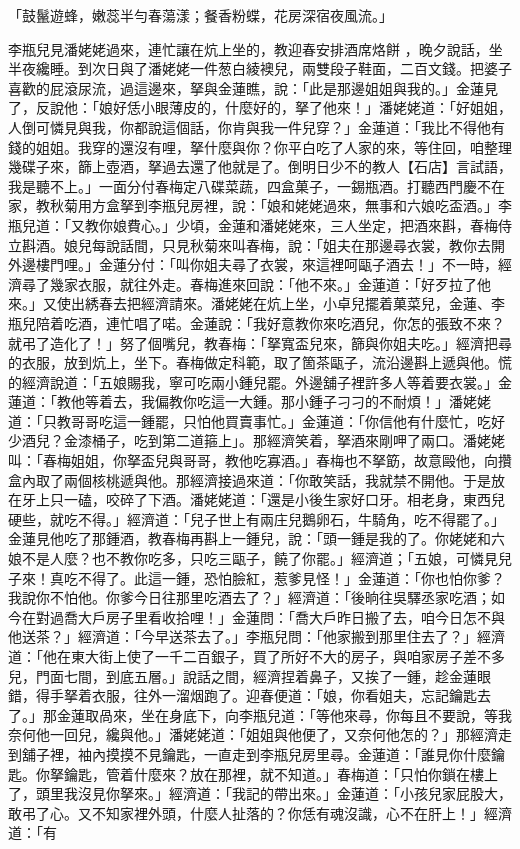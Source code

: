 \begin{showcontents}{}
「鼓鬣遊蜂，嫩蕊半勻春蕩漾；餐香粉蝶，花房深宿夜風流。」

李瓶兒見潘姥姥過來，連忙讓在炕上坐的，教迎春安排酒席烙餅 ，晚夕說話，坐半夜纔睡。到次日與了潘姥姥一件葱白綾襖兒，兩雙段子鞋面，二百文錢。把婆子喜歡的屁滾尿流，過這邊來，拏與金蓮瞧，說：「此是那邊姐姐與我的。」金蓮見了，反說他：「娘好恁小眼薄皮的，什麼好的，拏了他來！」潘姥姥道：「好姐姐，人倒可憐見與我，你都說這個話，你肯與我一件兒穿？」金蓮道：「我比不得他有錢的姐姐。我穿的還沒有哩，拏什麼與你？你平白吃了人家的來，等住回，咱整理幾碟子來，篩上壺酒，拏過去還了他就是了。倒明日少不的教人【石店】言試語，我是聽不上。」一面分付春梅定八碟菜蔬，四盒菓子，一錫瓶酒。打聽西門慶不在家，教秋菊用方盒拏到李瓶兒房裡，說：「娘和姥姥過來，無事和六娘吃盃酒。」李瓶兒道：「又教你娘費心。」少頃，金蓮和潘姥姥來，三人坐定，把酒來斟，春梅侍立斟酒。娘兒每說話間，只見秋菊來叫春梅，說：「姐夫在那邊尋衣裳，教你去開外邊樓門哩。」金蓮分付：「叫你姐夫尋了衣裳，來這裡呵甌子酒去！」不一時，經濟尋了幾家衣服，就往外走。春梅進來回說：「他不來。」金蓮道：「好歹拉了他來。」又使出綉春去把經濟請來。潘姥姥在炕上坐，小卓兒擺着菓菜兒，金蓮、李瓶兒陪着吃酒，連忙唱了喏。金蓮說：「我好意教你來吃酒兒，你怎的張致不來？就弔了造化了！」努了個嘴兒，教春梅：「拏寬盃兒來，篩與你姐夫吃。」經濟把尋的衣服，放到炕上，坐下。春梅做定科範，取了箇茶甌子，流沿邊斟上遞與他。慌的經濟說道：「五娘賜我，寧可吃兩小鍾兒罷。外邊舖子裡許多人等着要衣裳。」金蓮道：「教他等着去，我偏教你吃這一大鍾。那小鍾子刁刁的不耐煩！」潘姥姥道：「只教哥哥吃這一鍾罷，只怕他買賣事忙。」金蓮道：「你信他有什麼忙，吃好少酒兒？金漆桶子，吃到第二道箍上」。那經濟笑着，拏酒來剛呷了兩口。潘姥姥叫：「春梅姐姐，你拏盃兒與哥哥，教他吃寡酒。」春梅也不拏筯，故意毆他，向攢盒內取了兩個核桃遞與他。那經濟接過來道：「你敢笑話，我就禁不開他。于是放在牙上只一磕，咬碎了下酒。潘姥姥道：「還是小後生家好口牙。相老身，東西兒硬些，就吃不得。」經濟道：「兒子世上有兩庄兒鵝卵石，牛騎角，吃不得罷了。」金蓮見他吃了那鍾酒，教春梅再斟上一鍾兒，說：「頭一鍾是我的了。你姥姥和六娘不是人麼？也不教你吃多，只吃三甌子，饒了你罷。」經濟道；「五娘，可憐見兒子來！真吃不得了。此這一鍾，恐怕臉紅，惹爹見怪！」金蓮道：「你也怕你爹？我說你不怕他。你爹今日往那里吃酒去了？」經濟道：「後晌往吳驛丞家吃酒；如今在對過喬大戶房子里看收拾哩！」金蓮問：「喬大戶昨日搬了去，咱今日怎不與他送茶？」經濟道：「今早送茶去了。」李瓶兒問：「他家搬到那里住去了？」經濟道：「他在東大街上使了一千二百銀子，買了所好不大的房子，與咱家房子差不多兒，門面七間，到底五層。」說話之間，經濟捏着鼻子，又挨了一鍾，趁金蓮眼錯，得手拏着衣服，往外一溜烟跑了。迎春便道：「娘，你看姐夫，忘記鑰匙去了。」那金蓮取咼來，坐在身底下，向李瓶兒道：「等他來尋，你每且不要說，等我奈何他一回兒，纔與他。」潘姥姥道：「姐姐與他便了，又奈何他怎的？」那經濟走到舖子裡，袖內摸摸不見鑰匙，一直走到李瓶兒房里尋。金蓮道：「誰見你什麼鑰匙。你拏鑰匙，管着什麼來？放在那裡，就不知道。」春梅道：「只怕你鎖在樓上了，頭里我沒見你拏來。」經濟道：「我記的帶出來。」金蓮道：「小孩兒家屁股大，敢弔了心。又不知家裡外頭，什麼人扯落的？你恁有魂沒識，心不在肝上！」經濟道：「有
\end{showcontents}
